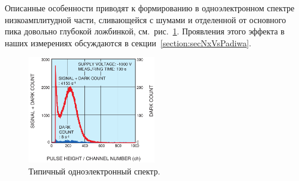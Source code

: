 Описанные особенности приводят к формированию в одноэлектронном спектре низкоамплитудной части, сливающейся с шумами и отделенной от основного пика довольно глубокой ложбинкой, см.~рис.~\ref{fig:SPEspectrum}. Проявления этого эффекта в наших измерениях обсуждаются в секции~\ref{section:secNxVsPadiwa}.

\begin{figure}
\includegraphics[width=0.5\textwidth]{pictures/3_Typical_spectrum_from_H12700.png}
\caption{Типичный одноэлектронный спектр.}
\label{fig:SPEspectrum}
\end{figure}
